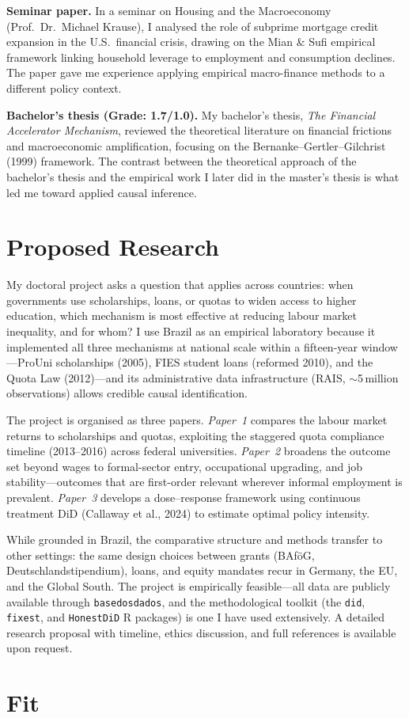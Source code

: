 \documentclass[a4paper,11pt]{article}
\begin{document}
\textbf{Seminar paper.} In a seminar on Housing and the Macroeconomy (Prof.\ Dr.\ Michael Krause), I analysed the role of subprime mortgage credit expansion in the U.S.\ financial crisis, drawing on the Mian \& Sufi empirical framework linking household leverage to employment and consumption declines. The paper gave me experience applying empirical macro-finance methods to a different policy context.

\textbf{Bachelor's thesis (Grade: 1.7/1.0).} My bachelor's thesis, \textit{The Financial Accelerator Mechanism}, reviewed the theoretical literature on financial frictions and macroeconomic amplification, focusing on the Bernanke--Gertler--Gilchrist (1999) framework. The contrast between the theoretical approach of the bachelor's thesis and the empirical work I later did in the master's thesis is what led me toward applied causal inference.

\section*{Proposed Research}

My doctoral project asks a question that applies across countries: when governments use scholarships, loans, or quotas to widen access to higher education, which mechanism is most effective at reducing labour market inequality, and for whom? I use Brazil as an empirical laboratory because it implemented all three mechanisms at national scale within a fifteen-year window---ProUni scholarships (2005), FIES student loans (reformed 2010), and the Quota Law (2012)---and its administrative data infrastructure (RAIS, $\sim$5\,million observations) allows credible causal identification.

The project is organised as three papers. \textit{Paper~1} compares the labour market returns to scholarships and quotas, exploiting the staggered quota compliance timeline (2013--2016) across federal universities. \textit{Paper~2} broadens the outcome set beyond wages to formal-sector entry, occupational upgrading, and job stability---outcomes that are first-order relevant wherever informal employment is prevalent. \textit{Paper~3} develops a dose--response framework using continuous treatment DiD (Callaway et al., 2024) to estimate optimal policy intensity.

While grounded in Brazil, the comparative structure and methods transfer to other settings: the same design choices between grants (BAf\"oG, Deutschlandstipendium), loans, and equity mandates recur in Germany, the EU, and the Global South. The project is empirically feasible---all data are publicly available through \texttt{basedosdados}, and the methodological toolkit (the \texttt{did}, \texttt{fixest}, and \texttt{HonestDiD} R packages) is one I have used extensively. A detailed research proposal with timeline, ethics discussion, and full references is available upon request.

\section*{Fit}

\end{document}
